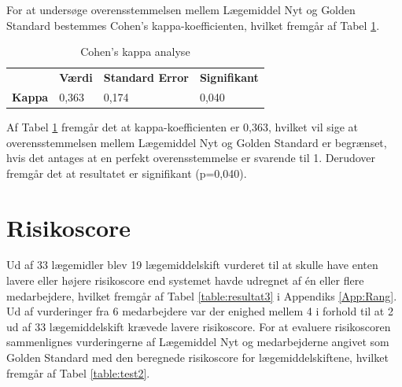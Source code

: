For at undersøge overensstemmelsen mellem Lægemiddel Nyt og Golden Standard bestemmes Cohen's kappa-koefficienten, hvilket fremgår af Tabel \ref{table:Kappa}.

\begin{table}[H]
\caption{Cohen's kappa analyse}
\label{table:Kappa}
\centering
\begin{tabular}{l|l|l|l}
 \rowcolor[HTML]{C0C0C0}  &  \textbf{Værdi} &   \textbf{Standard Error} & \textbf{Signifikant} \\ 
  \cellcolor[HTML]{C0C0C0}                                                       \textbf{Kappa} & 0,363 & 0,174 & 0,040 \\
\end{tabular}
\end{table}

Af Tabel \ref{table:Kappa} fremgår det at kappa-koefficienten er 0,363, hvilket vil sige at overensstemmelsen mellem Lægemiddel Nyt og Golden Standard er begrænset, hvis det antages at en perfekt overensstemmelse er svarende til 1. Derudover fremgår det at resultatet er signifikant (p=0,040).

\section{Risikoscore}
Ud af 33 lægemidler blev 19 lægemiddelskift  vurderet til at skulle have enten lavere eller højere risikoscore end systemet havde udregnet af én eller flere medarbejdere, hvilket fremgår af Tabel \ref{table:resultat3} i Appendiks \ref{App:Rang}. Ud af vurderinger fra 6 medarbejdere var der enighed mellem 4 i forhold til  at 2 ud af 33 lægemiddelskift krævede lavere risikoscore. For at evaluere risikoscoren sammenlignes vurderingerne af Lægemiddel Nyt og medarbejderne angivet som Golden Standard med den beregnede risikoscore for lægemiddelskiftene, hvilket fremgår af Tabel \ref{table:test2}.

